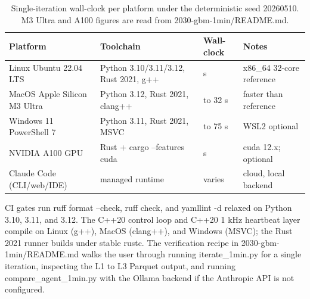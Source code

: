 \begin{table}[H]
\centering
\caption{Single-iteration wall-clock per platform under the
deterministic seed 20260510. M3 Ultra and A100 figures are read
from 2030-gbm-1min/README.md.}
\label{tab:platforms}
\begin{tabular}{>{\raggedright\arraybackslash}p{4.5cm}
                >{\raggedright\arraybackslash}p{4.8cm}
                >{\raggedright\arraybackslash}p{2.3cm}
                >{\raggedright\arraybackslash}p{3.1cm}}
\toprule
\textbf{Platform} & \textbf{Toolchain} & \textbf{Wall-clock} & \textbf{Notes} \\
\midrule
Linux Ubuntu 22.04 LTS & Python 3.10/3.11/3.12, Rust 2021, g++ & 60 s & x86_64 32-core reference \\
MacOS Apple Silicon M3 Ultra & Python 3.12, Rust 2021, clang++ & 26 to 32 s & faster than reference \\
Windows 11 PowerShell 7 & Python 3.11, Rust 2021, MSVC & 60 to 75 s & WSL2 optional \\
NVIDIA A100 GPU & Rust + cargo --features cuda & 12 s & cuda 12.x; optional \\
Claude Code (CLI/web/IDE) & managed runtime & varies & cloud, local backend \\
\bottomrule
\end{tabular}
\end{table}

CI gates run ruff format --check, ruff check, and yamllint -d
relaxed on Python 3.10, 3.11, and 3.12. The C++20 control loop and
C++20 1 kHz heartbeat layer compile on Linux (g++), MacOS (clang++),
and Windows (MSVC); the Rust 2021 runner builds under stable rustc.
The verification recipe in 2030-gbm-1min/README.md walks the user
through running iterate_1min.py for a single iteration, inspecting
the L1 to L3 Parquet output, and running compare_agent_1min.py with
the Ollama backend if the Anthropic API is not configured.

\clearpage